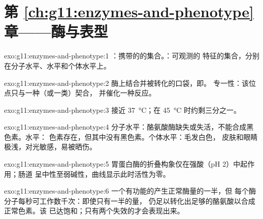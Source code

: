 \section*{第 \ref{ch:g11:enzymes-and-phenotype} 章——酶与表型}

\begin{solution}{exo:g11:enzymes-and-phenotype:1}
：携带的的集合。：可观测的
特征的集合，分别在分子水平、水平和个体水平上。
\end{solution}

\begin{solution}{exo:g11:enzymes-and-phenotype:2}
酶上结合并被转化的口袋，即。
专一性：该位点只与一种（或一类）契合，
并催化一种反应。
\end{solution}

\begin{solution}{exo:g11:enzymes-and-phenotype:3}
接近 \qty{37}{\celsius}；在 \qty{45}{\celsius} 时约剩三分之一。
\end{solution}

\begin{solution}{exo:g11:enzymes-and-phenotype:4}
分子水平：酪氨酸酶缺失或失活，不能合成黑色素。水平：
色素存在，但其中没有黑色素。个体水平：毛发白色，
皮肤和眼睛极浅，对光敏感，易被晒伤。
\end{solution}

\begin{solution}{exo:g11:enzymes-and-phenotype:5}
胃蛋白酶的折叠构象仅在强酸（pH 2）中起作用；肠道
呈中性至弱碱性，曲线显示此时活性为零。
\end{solution}

\begin{solution}{exo:g11:enzymes-and-phenotype:6}
一个有功能的产生正常酶量的一半，但
每个酶分子每秒可工作数千次：即使只有一半的量，
仍足以转化出足够的酪氨酸以合成正常色素。该
已达饱和；只有两个失效的才会表现出来。
\end{solution}

